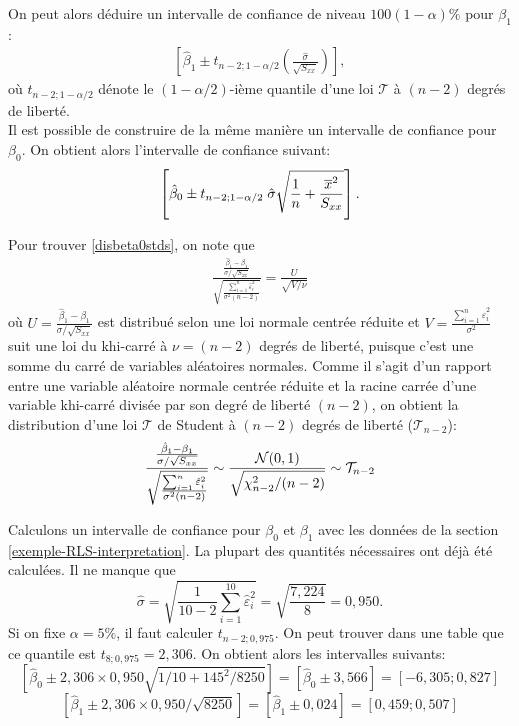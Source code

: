 On peut alors déduire un intervalle de confiance de niveau $100(1-\alpha)\%$ pour $\beta_1$:
\begin{eqnarray}
\left[\hat{\beta}_1 \pm t_{n-2; 1-\alpha/2} \left(\frac{\hat\sigma}{\sqrt{S_{xx}}}\right)\right],
\end{eqnarray}
où $t_{n-2; 1-\alpha/2}$ dénote le $(1-\alpha/2)$-ième quantile d'une loi $\mathcal{T}$ à $(n-2)$ degrés de liberté.\\

 Il est possible de construire de la même manière un intervalle de confiance pour $\beta_0$. On obtient alors l'intervalle de confiance suivant:
 \begin{eqnarray}
\left[\hat{\beta}_0\pm t_{n-2; 1-\alpha/2}\; \hat\sigma\sqrt{{1\over n}+{\overline{x}^2\over S_{xx}}}\right].
\label{ci:beta0}
\end{eqnarray}

\vspace{0.05in}
\begin{remarque}
Pour trouver \ref{disbeta0stds}, on note que
\begin{eqnarray*}
 \frac{\frac{\hat{\beta}_1-\beta_1}{\sigma/\sqrt{S_{xx}}}}{\sqrt{\frac{\sum_{i=1}^n \hat{\varepsilon}_i^2}{\sigma^2 (n-2)}}}=\frac{U}{\sqrt{V/\nu}}
\end{eqnarray*}
où $U=\frac{\hat{\beta}_1-\beta_1}{\sigma/\sqrt{S_{xx}}}$ est distribué selon une loi normale centrée réduite et $V=\frac{\sum_{i=1}^n \hat{\varepsilon}_i^2}{\sigma^2}$ suit une loi du khi-carré à $\nu=(n-2)$ degrés de liberté, puisque c'est une somme du carré de variables aléatoires normales.
Comme il s'agit d'un rapport entre une variable aléatoire normale centrée réduite et la racine carrée d'une variable khi-carré divisée par son degré de liberté  $(n-2)$, on obtient la distribution d'une loi $\mathcal{T}$ de Student à $(n-2)$ degrés de liberté ($\mathcal{T}_{n-2}$):
\begin{eqnarray*}
 \frac{\frac{\hat{\beta}_1-\beta_1}{\sigma/\sqrt{S_{xx}}}}{\sqrt{\frac{\sum_{i=1}^n \hat{\varepsilon}_i^2}{\sigma^2 (n-2)}}} \sim \frac{\mathcal{N}(0,1)}{\sqrt{\chi_{n-2}^2/(n-2)}} \sim \mathcal{T}_{n-2}
 \end{eqnarray*}
\end{remarque}

\vspace{0.1in}
\begin{exemple}
\label{exp:int_beta}
Calculons un intervalle de confiance pour $\beta_0$ et $\beta_1$ avec les données de la section \ref{exemple-RLS-interpretation}. La plupart des quantités nécessaires ont déjà été calculées. Il ne manque que
$$\hat\sigma=\sqrt{\frac{1}{10-2} \sum_{i=1}^{10}\hat\varepsilon_i^2}=\sqrt{\frac{7,224}{8}}=0,950.$$
Si on fixe $\alpha=5\%$, il faut calculer $t_{n-2; 0,975}$. On peut trouver dans une table que ce quantile est  $t_{8;0,975}=2,306$. On obtient alors les intervalles suivants:
$$[\hat{\beta}_0\pm 2,306\times0,950\sqrt{1/10+145^2/8250}]=[\hat{\beta}_0\pm 3,566]=[-6,305;0,827]$$
$$[\hat{\beta}_1\pm 2,306\times 0,950/\sqrt{8250}]=[\hat{\beta}_1\pm 0,024]=[0,459;0,507]$$

\end{exemple}

